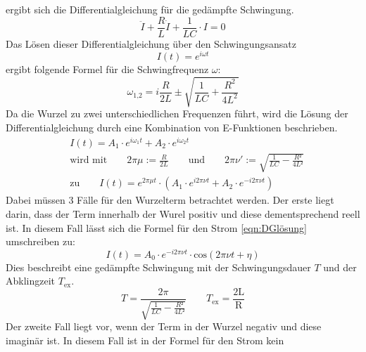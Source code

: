 \documentclass[titlepage = firstcover]{scrartcl}
\begin{document}
            ergibt sich die Differentialgleichung für die gedämpfte Schwingung.
            \begin{equation}
                \ddot{I} + \frac{R}{L} \dot{I} + \frac{1}{LC} \cdot I = 0
            \end{equation}
            Das Lösen dieser Differentialgleichung über den Schwingungsansatz
            \begin{equation*}
                I(t) = e^{i\omega t}
            \end{equation*} 
            ergibt folgende Formel für die Schwingfrequenz $\omega$:
            \begin{equation}
                \omega_{\text{1,2}} = i\frac{R}{2L} \pm \sqrt{\frac{1}{LC} + \frac{R^2}{4L^2}}
                \label{eqn:omega}
            \end{equation}
            Da die Wurzel zu zwei unterschiedlichen Frequenzen führt, wird die Lösung der Differentialgleichung durch eine Kombination von E-Funktionen
            beschrieben.
            \begin{align}
                &I(t) = A_1 \cdot e^{i\omega_1 t} + A_2 \cdot e^{i \omega_2 t} \\
                &\text{wird mit} \qquad 2\pi\mu := \frac{R}{2L} \qquad \text{und} \qquad 2\pi\nu ' := \sqrt{\frac{1}{LC}-\frac{R²}{4L²}} \\
                &\text{zu} \qquad I(t) = e^{2\pi\mu t} \cdot (A_1 \cdot e^{i2\pi\nu t} + A_2 \cdot e^{-i2\pi\nu t})
                \label{eqn:DGlösung}
            \end{align}
            Dabei müssen 3 Fälle für den Wurzelterm betrachtet werden. Der erste liegt darin, dass der Term innerhalb der Wurel positiv und diese 
            dementsprechend reell ist. In diesem Fall lässt sich die Formel für den Strom \ref{eqn:DGlösung} umschreiben zu:
            \begin{equation}
                I(t) = A_0 \cdot e^{-i2\pi\nu t} \cdot \text{cos}(2\pi\nu t + \eta)
            \end{equation}
            Dies beschreibt eine gedämpfte Schwingung mit der Schwingungsdauer $T$ und der Abklingzeit $T_{\text{ex}}$.
            \begin{equation}
                T = \frac{2\pi}{\sqrt{\frac{1}{LC}-\frac{R²}{4L²}}} \qquad T_{\text{ex}} = \frac{\text{2L}}{\text{R}}
                \label{eqn:Tpositiv}
            \end{equation}
            Der zweite Fall liegt vor, wenn der Term in der Wurzel negativ und diese imaginär ist. In diesem Fall ist in der Formel für den Strom kein 
\end{document}
